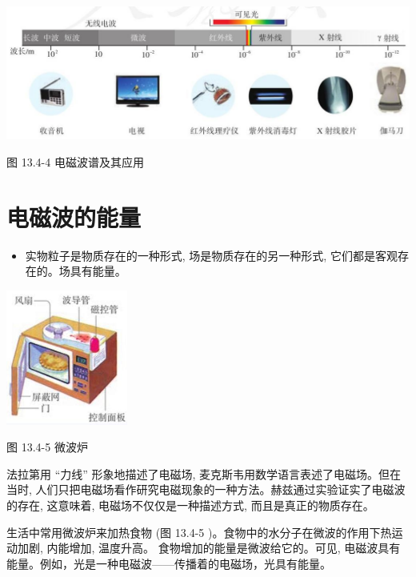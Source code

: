 \documentclass[10pt]{article}
\begin{document}
\begin{center}
\includegraphics[max width=1.0\textwidth]{images/01911d5f-8e38-70c0-b5b8-2b399bd115b6_126_225430.jpg}
\end{center}

图 13.4-4 电磁波谱及其应用

\section*{电磁波的能量}

\begin{mdframed}

\begin{itemize}
\item 实物粒子是物质存在的一种形式, 场是物质存在的另一种形式, 它们都是客观存在的。场具有能量。
\end{itemize}

\begin{center}
\includegraphics[max width=0.3\textwidth]{images/01911d5f-8e38-70c0-b5b8-2b399bd115b6_127_915748.jpg}
\end{center}

图 13.4-5 微波炉

\end{mdframed}

法拉第用 “力线” 形象地描述了电磁场, 麦克斯韦用数学语言表述了电磁场。但在当时, 人们只把电磁场看作研究电磁现象的一种方法。赫兹通过实验证实了电磁波的存在, 这意味着, 电磁场不仅仅是一种描述方式, 而且是真正的物质存在。

生活中常用微波炉来加热食物 (图 13.4-5 )。食物中的水分子在微波的作用下热运动加剧, 内能增加, 温度升高。 食物增加的能量是微波给它的。可见, 电磁波具有能量。例如，光是一种电磁波——传播着的电磁场，光具有能量。
\end{document}

